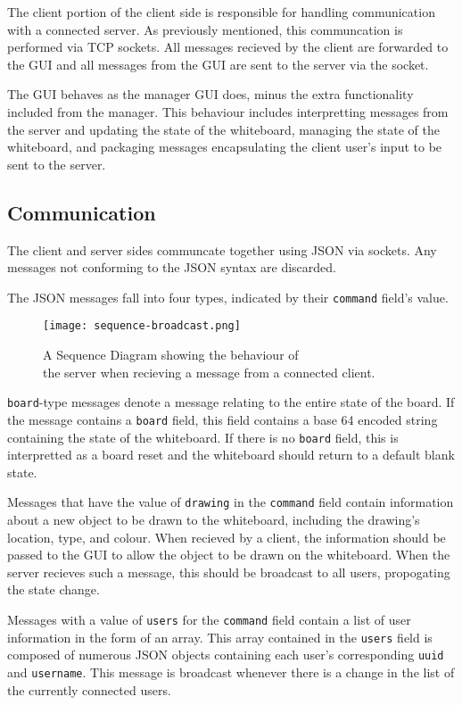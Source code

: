 \documentclass[12pt]{article}
\begin{document}
The client portion of the client side is responsible for handling communication with a connected server. As previously mentioned, this communcation is performed via TCP sockets. All messages recieved by the client are forwarded to the GUI and all messages from the GUI are sent to the server via the socket. 

The GUI behaves as the manager GUI does, minus the extra functionality included from the manager. This behaviour includes interpretting messages from the server and updating the state of the whiteboard, managing the state of the whiteboard, and packaging messages encapsulating the client user's input to be sent to the server. 

\subsection{Communication}
The client and server sides communcate together using JSON via sockets. Any messages not conforming to the JSON syntax are discarded. 

The JSON messages fall into four types, indicated by their \texttt{command} field's value.

\begin{figure}[ht]
  \centering
  \texttt{[image: sequence-broadcast.png]}
  \caption{
    A Sequence Diagram showing the behaviour of \\ the server when recieving a message from a connected client.
  }
  \label{fig:broadcast}
\end{figure}

\texttt{board}-type messages denote a message relating to the entire state of the board. If the message contains a \texttt{board} field, this field contains a base 64 encoded string containing the state of the whiteboard. If there is no \texttt{board} field, this is interpretted as a board reset and the whiteboard should return to a default blank state.

Messages that have the value of \texttt{drawing} in the \texttt{command} field contain information about a new object to be drawn to the whiteboard, including the drawing's location, type, and colour. When recieved by a client, the information should be passed to the GUI to allow the object to be drawn on the whiteboard. When the server recieves such a message, this should be broadcast to all users, propogating the state change.

Messages with a value of \texttt{users} for the \texttt{command} field contain a list of user information in the form of an array. This array contained in the \texttt{users} field is composed of numerous JSON objects containing each user's corresponding \texttt{uuid} and \texttt{username}. This message is broadcast whenever there is a change in the list of the currently connected users.
\end{document}

